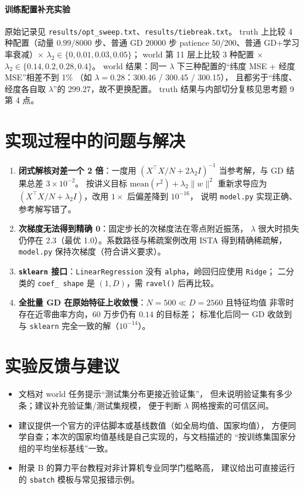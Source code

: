 \documentclass[UTF8,a4paper]{ctexart}
\begin{document}
\paragraph{训练配置补充实验}
原始记录见 \texttt{results/opt\_sweep.txt}、\texttt{results/tiebreak.txt}。
truth 上比较 4 种配置（动量 $0.99/8000$ 步、普通 GD $20000$ 步
patience 50/200、普通 GD+学习率衰减）$\times$
$\lambda_2\in\{0,0.01,0.03,0.05\}$；
world 第 11 层上比较 3 种配置 $\times$ $\lambda_2\in\{0.14,0.2,0.28,0.4\}$。
world 结果：同一 $\lambda$ 下三种配置的“纬度 MSE + 经度 MSE”相差不到 1\%
（如 $\lambda=0.28$：300.46 / 300.45 / 300.15），
且都劣于“纬度、经度各自取 $\lambda$”的 299.27，故不更换配置。
truth 结果与内部切分复核见思考题 9 第 4 点。

\section{实现过程中的问题与解决}

\begin{enumerate}
  \item \textbf{闭式解核对差一个 2 倍}：一度用
  $(X^\top X/N+2\lambda_2 I)^{-1}$ 当参考解，与 GD 结果总差 $3\times10^{-2}$。
  按讲义目标 $\text{mean}(r^2)+\lambda_2\|w\|^2$ 重新求导应为
  $(X^\top X/N+\lambda_2 I)$，改用 $1\times$ 后偏差降到 $10^{-16}$，
  说明 \texttt{model.py} 实现正确、参考解写错了。
  \item \textbf{次梯度无法得到精确 0}：固定步长的次梯度法在零点附近振荡，
  $\lambda$ 很大时损失仍停在 2.3（最优 1.0）。系数路径与稀疏案例改用 ISTA
  得到精确稀疏解，\texttt{model.py} 保持次梯度（符合讲义要求）。
  \item \textbf{\texttt{sklearn} 接口}：\texttt{LinearRegression} 没有
  \texttt{alpha}，岭回归应使用 \texttt{Ridge}；
  二分类的 \texttt{coef\_ shape} 是 $(1,D)$，需 \texttt{ravel()} 后再比较。
  \item \textbf{全批量 GD 在原始特征上收敛慢}：$N=500\ll D=2560$ 且特征均值
  非零时存在近零曲率方向，60 万步仍有 $0.14$ 的目标差；
  标准化后同一 GD 收敛到与 \texttt{sklearn} 完全一致的解（$10^{-14}$）。
\end{enumerate}

\section{实验反馈与建议}

\begin{itemize}
  \item 文档对 world 任务提示“测试集分布更接近验证集”，
  但未说明验证集有多少条；建议补充验证集/测试集规模，
  便于判断 $\lambda$ 网格搜索的可信区间。
  \item 建议提供一个官方的评估脚本或基线数值（如全局均值、国家均值），
  方便同学自查；本次的国家均值基线是自己实现的，与文档描述的
  “按训练集国家分组的平均坐标基线”一致。
  \item 附录 B 的算力平台教程对非计算机专业同学门槛略高，
  建议给出可直接运行的 \texttt{sbatch} 模板与常见报错示例。
\end{itemize}
\end{document}
